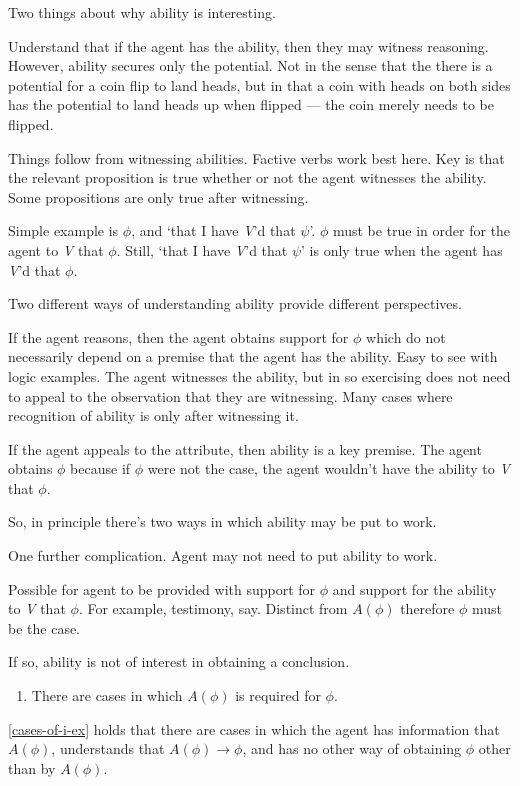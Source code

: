 Two things about why ability is interesting.

Understand that if the agent has the ability, then they may witness reasoning.
However, ability secures only the potential.
Not in the sense that the there is a potential for a coin flip to land heads, but in that a coin with heads on both sides has the potential to land heads up when flipped --- the coin merely needs to be flipped.

Things follow from witnessing abilities.
Factive verbs work best here.
Key is that the relevant proposition is true whether or not the agent witnesses the ability.
Some propositions are only true after witnessing.

Simple example is \(\phi\), and `that I have \emph{V}'d that \(\psi\)'.
\(\phi\) must be true in order for the agent to \emph{V} that \(\phi\).
Still, `that I have \emph{V}'d that \(\psi\)' is only true when the agent has \emph{V}'d that \(\phi\).

Two different ways of understanding ability provide different perspectives.

If the agent reasons, then the agent obtains support for \(\phi\) which do not necessarily depend on a premise that the agent has the ability.
Easy to see with logic examples.
The agent witnesses the ability, but in so exercising does not need to appeal to the observation that they are witnessing.
Many cases where recognition of ability is only after witnessing it.

If the agent appeals to the attribute, then ability is a key premise.
The agent obtains \(\phi\) because if \(\phi\) were not the case, the agent wouldn't have the ability to \emph{V} that \(\phi\).

So, in principle there's two ways in which ability may be put to work.

One further complication.
Agent may not need to put ability to work.

Possible for agent to be provided with support for \(\phi\) and support for the ability to \emph{V} that \(\phi\).
For example, testimony, say.
Distinct from \(A(\phi)\) therefore \(\phi\) must be the case.

If so, ability is not of interest in obtaining a conclusion.

\begin{enumerate}
\item\label{cases-of-i-ex} There are cases in which \(A(\phi)\) is required for \(\phi\).
\end{enumerate}

\ref{cases-of-i-ex} holds that there are cases in which the agent has information that \(A(\phi)\), understands that \(A(\phi) \rightarrow \phi\), and has no other way of obtaining \(\phi\) other than by \(A(\phi)\).